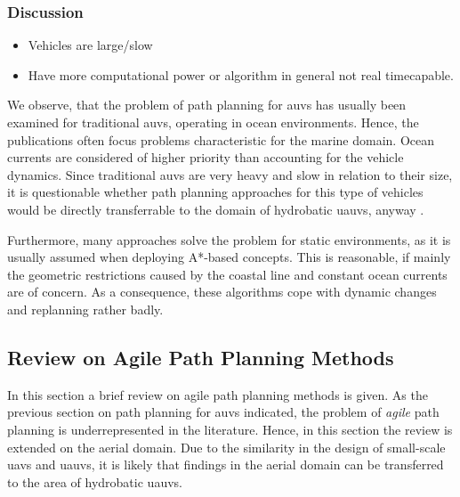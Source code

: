 \subsubsection{Discussion}
\begin{itemize}
    \color{red}
    \item Vehicles are large/slow
    \item Have more computational power or algorithm in general not real timecapable.
\end{itemize}

We observe, that the problem of path planning for \acp{auv} has usually been examined for traditional \acp{auv}, operating in ocean environments.
Hence, the publications often focus problems characteristic for the marine domain.
Ocean currents are considered of higher priority than accounting for the vehicle dynamics.
Since traditional \acp{auv} are very heavy and slow in relation to their size, it is questionable whether path planning approaches for this type of vehicles would be directly transferrable to the domain of hydrobatic \acp{uauv}, anyway \cite{hydrobatic}.

Furthermore, many approaches solve the problem for static environments, as it is usually assumed when deploying A*-based concepts. This is reasonable, if mainly the geometric restrictions caused by the coastal line and constant ocean currents are of concern. As a consequence, these algorithms cope with dynamic changes and replanning rather badly.

\subsection{Review on Agile Path Planning Methods}
In this section a brief review on agile path planning methods is given. As the previous section on path planning for \acp{auv} indicated, the problem of \emph{agile} path planning is underrepresented in the literature. Hence, in this section the review is extended on the aerial domain. Due to the similarity in the design of small-scale \acp{uav} and \acp{uauv}, it is likely that findings in the aerial domain can be transferred to the area of hydrobatic \acp{uauv}.

